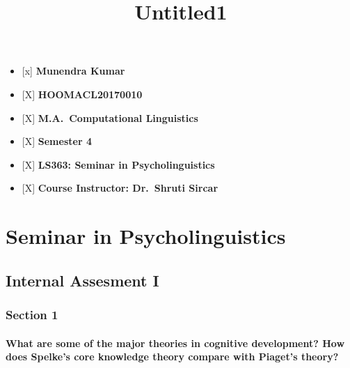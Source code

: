 \documentclass[11pt]{article}
\title{Untitled1}
\providecommand{\tightlist}{%
      \setlength{\itemsep}{0pt}\setlength{\parskip}{0pt}}
\begin{document}
    
    
    \maketitle
    
    

    
    \begin{itemize}
\tightlist
\item
  {[}x{]} \textbf{Munendra Kumar}
\item
  {[}X{]} \textbf{HOOMACL20170010}
\item
  {[}X{]} \textbf{M.A.~Computational Linguistics}
\item
  {[}X{]} \textbf{Semester 4}
\item
  {[}X{]} \textbf{LS363: Seminar in Psycholinguistics}
\item
  {[}X{]} \textbf{Course Instructor: Dr.~Shruti Sircar}
\end{itemize}

    \hypertarget{seminar-in-psycholinguistics}{%
\section{Seminar in
Psycholinguistics}\label{seminar-in-psycholinguistics}}

\hypertarget{internal-assesment-i}{%
\subsection{Internal Assesment I}\label{internal-assesment-i}}

    \hypertarget{section-1}{%
\subsubsection{Section 1}\label{section-1}}

\hypertarget{what-are-some-of-the-major-theories-in-cognitive-development-how-does-spelkes-core-knowledge-theory-compare-with-piagets-theory}{%
\paragraph{What are some of the major theories in cognitive development?
How does Spelke's core knowledge theory compare with Piaget's
theory?}\label{what-are-some-of-the-major-theories-in-cognitive-development-how-does-spelkes-core-knowledge-theory-compare-with-piagets-theory}}
\end{document}
